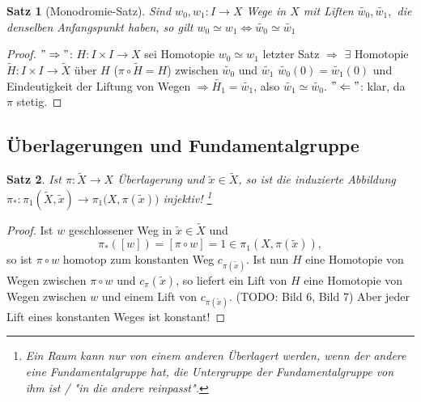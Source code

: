 \documentclass[a4paper,11pt,notitlepage]{report}
\newtheorem{theorem}{Satz}[chapter]
\theoremstyle{remark}
\theoremstyle{definition}
\begin{document}
\begin{theorem}[Monodromie-Satz]
	Sind $w_0, w_1 \colon I \rightarrow X$ Wege in $X$ mit Liften $\widetilde{w_0}, \widetilde{w_1},$ die denselben Anfangspunkt haben, so gilt $w_0 \simeq w_1 \Leftrightarrow \widetilde{w_0} \simeq \widetilde{w_1}$
\end{theorem}

\begin{proof}
	$"\Rightarrow"$: $H \colon I \times I \rightarrow X$ sei Homotopie $w_0 \simeq w_1$ letzter Satz $\Rightarrow$ $\exists$ Homotopie $\widetilde{H} \colon I \times I \rightarrow \widetilde{X}$ über $H$ ($\pi \circ \widetilde{H} = H$) zwischen $\widetilde{w_0}$ und $\widetilde{w_1}$
	\newline
	$\widetilde{w_0}(0) = \widetilde{w_1}(0)$ und Eindeutigkeit der Liftung von Wegen $\Rightarrow \widetilde{H_1} = \widetilde{w_1}$, also $\widetilde{w_1} \simeq \widetilde{w_0}$.
	\newline
	$"\Leftarrow"$: klar, da $\pi$ stetig.
\end{proof}

\subsection{Überlagerungen und Fundamentalgruppe}
\begin{theorem}
	Ist $\pi \colon \widetilde{X} \rightarrow X$ Überlagerung und $\widetilde{x} \in \widetilde{X}$, so ist die induzierte Abbildung $\pi_* \colon \pi_1(\widetilde{X},\widetilde{x}) \rightarrow \pi_1\big(X, \pi(\widetilde{x})\big)$ injektiv! \footnote{Ein Raum kann nur von einem anderen Überlagert werden, wenn der andere eine Fundamentalgruppe hat, die Untergruppe der Fundamentalgruppe von ihm ist / "in die andere reinpasst".}
\end{theorem}

\begin{proof}
	Ist $w$ geschlossener Weg in $\widetilde{x} \in \widetilde{X}$ und
$$\pi_*([w]) = [\pi \circ w] = 1 \in \pi_1(X, \pi(\widetilde{x})),$$
so ist $\pi \circ w$ homotop zum konstanten Weg $c_{\pi(\widetilde{x})}$. Ist nun $H$ eine Homotopie von Wegen zwischen $\pi \circ w$ und $c_\pi(\widetilde{x})$, so liefert ein Lift von $H$ eine Homotopie von Wegen zwischen $w$ und einem Lift von $c_{\pi(\widetilde{x})}$. 
(TODO: Bild 6, Bild 7)
\newline
Aber jeder Lift eines konstanten Weges ist konstant!
\end{proof}
\end{document}
